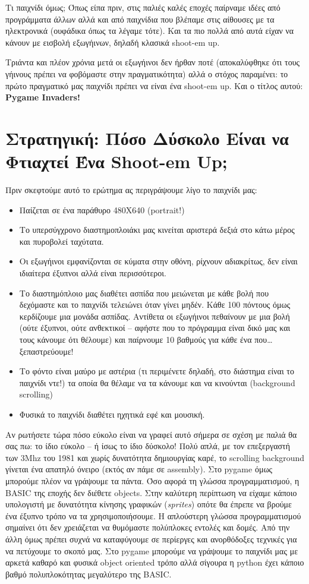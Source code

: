 Τι παιχνίδι όμως; Όπως είπα πριν, στις παλιές καλές εποχές παίρναμε ιδέες από προγράμματα άλλων αλλά και από παιχνίδια που βλέπαμε στις αίθουσες με τα ηλεκτρονικά (ουφάδικα όπως τα λέγαμε τότε). Και τα πιο πολλά από αυτά είχαν να κάνουν με εισβολή εξωγήινων, δηλαδή κλασικά shoot-em up.

Τριάντα και πλέον χρόνια μετά οι εξωγήινοι δεν ήρθαν ποτέ (αποκαλύφθηκε ότι τους γήινους πρέπει να φοβόμαστε στην πραγματικότητα) αλλά ο στόχος παραμένει: το πρώτο πραγματικό μας παιχνίδι πρέπει να είναι ένα shoot-em up. Και ο τίτλος αυτού: {\bf Pygame Invaders!}

\section{Στρατηγική: Πόσο Δύσκολο Είναι να Φτιαχτεί Ένα Shoot-em Up;}

Πριν σκεφτούμε αυτό το ερώτημα ας περιγράψουμε λίγο το παιχνίδι μας:
%
\begin{itemize}
\item Παίζεται σε ένα παράθυρο 480Χ640 (portrait!)
\item Το υπερσύγχρονο διαστημοπλοιάκι μας κινείται αριστερά δεξιά στο κάτω μέρος και πυροβολεί ταχύτατα.
\item Οι εξωγήινοι εμφανίζονται σε κύματα στην οθόνη, ρίχνουν αδιακρίτως, δεν είναι ιδιαίτερα έξυπνοι αλλά είναι περισσότεροι.
\item Το διαστημόπλοιο μας διαθέτει ασπίδα που μειώνεται με κάθε βολή που δεχόμαστε και το παιχνίδι τελειώνει όταν γίνει μηδέν. Κάθε 100 πόντους όμως κερδίζουμε μια μονάδα ασπίδας. Αντίθετα οι εξωγήινοι πεθαίνουν με μια βολή (ούτε έξυπνοι, ούτε ανθεκτικοί -- αφήστε που το πρόγραμμα είναι δικό μας και τους κάνουμε ότι θέλουμε) και παίρνουμε 10 βαθμούς για κάθε ένα που\ldots{} ξεπαστρεύουμε!
\item Το φόντο είναι μαύρο με αστέρια (τι περιμένετε δηλαδή, στο διάστημα είναι το παιχνίδι ντε!) τα οποία θα θέλαμε να τα κάνουμε και να κινούνται (background scrolling)
\item Φυσικά το παιχνίδι διαθέτει ηχητικά εφέ και μουσική.
\end{itemize}
%
Αν ρωτήσετε τώρα πόσο εύκολο είναι να γραφεί αυτό σήμερα σε σχέση με παλιά θα σας πω: το ίδιο εύκολο -- ή ίσως το ίδιο δύσκολο! Πολύ απλά, με τον επεξεργαστή των 3Mhz του 1981 και χωρίς δυνατότητα δημιουργίας καρέ, το scrolling background γίνεται ένα απατηλό όνειρο (εκτός αν πάμε σε assembly). Στο pygame όμως μπορούμε πλέον να γράψουμε τα πάντα. Όσο αφορά τη γλώσσα προγραμματισμού, η BASIC της εποχής δεν διέθετε objects. Στην καλύτερη περίπτωση να είχαμε κάποιο υπολογιστή με δυνατότητα κίνησης γραφικών ({\em sprites}) οπότε θα έπρεπε να βρούμε ένα έξυπνο τρόπο να τα χρησιμοποιήσουμε. Η απλούστερη γλώσσα προγραμματισμού σημαίνει ότι δεν χρειάζεται να θυμόμαστε πολύπλοκες εντολές και δομές. Από την άλλη όμως πρέπει συχνά να καταφύγουμε σε περίεργες και ανορθόδοξες τεχνικές για να πετύχουμε το σκοπό μας.  Στο pygame μπορούμε να γράψουμε το παιχνίδι μας με αρκετά καθαρό και φυσικά object oriented τρόπο αλλά σίγουρα η python έχει κάποιο βαθμό πολυπλοκότητας μεγαλύτερο της BASIC.

